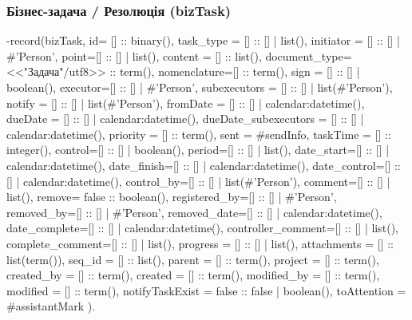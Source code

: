\documentclass{article}
\let\originalfootnotesize\footnotesize
\let\oldverbatim\verbatim
\let\oldendverbatim\endverbatim
\renewenvironment{verbatim}{\originalfootnotesize\oldverbatim}{\oldendverbatim}
\begin{document}
\subsubsection{Бізнес-задача / Резолюція (bizTask)}
\begin{verbatim}
-record(bizTask, { id= [] :: binary(),
                   task_type = [] :: [] | list(),
                   initiator = [] :: [] | #'Person'{},
                   point=[] :: [] | list(),
                   content = [] :: list(),
                   document_type= <<"Задача"/utf8>> :: term(),
                   nomenclature=[] :: term(),
                   sign = [] :: [] | boolean(),
                   executor=[] :: [] | #'Person'{},
                   subexecutors = [] :: [] | list(#'Person'{}),
                   notify = [] :: [] | list(#'Person'{}),
                   fromDate = [] :: [] | calendar:datetime(),
                   dueDate = [] :: [] | calendar:datetime(),
                   dueDate_subexecutors = [] :: [] | calendar:datetime(),
                   priority = [] :: term(),
                   sent = #sendInfo{},
                   taskTime = [] :: integer(),
                   control=[] :: [] | boolean(),
                   period=[] :: [] | list(),
                   date_start=[] :: [] | calendar:datetime(),
                   date_finish=[] :: [] | calendar:datetime(),
                   date_control=[] :: [] | calendar:datetime(),
                   control_by=[] :: [] | list(#'Person'{}),
                   comment=[] :: [] | list(),
                   remove= false :: boolean(),
                   registered_by=[] :: [] | #'Person'{},
                   removed_by=[] :: [] | #'Person'{},
                   removed_date=[] :: [] | calendar:datetime(),
                   date_complete=[] :: [] | calendar:datetime(),
                   controller_comment=[] :: [] | list(),
                   complete_comment=[] :: [] | list(),
                   progress = [] :: [] | list(),
                   attachments = [] :: list(term()),
                   seq_id = [] :: list(),
                   parent = [] :: term(),
                   project = [] :: term(),
                   created_by = [] :: term(),
                   created = [] :: term(),
                   modified_by = [] :: term(),
                   modified = [] :: term(),
                   notifyTaskExist = false :: false | boolean(),
                   toAttention = #assistantMark{}
                 }).
\end{verbatim}
\end{document}

